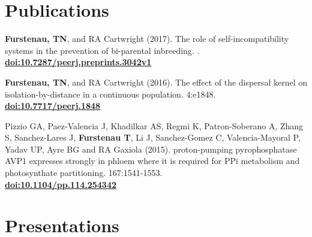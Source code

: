 \documentclass[]{cv-style}          %
\begin{document}

\section{Publications}
\textbf{Furstenau, TN}, and RA Cartwright (2017). The role of self-incompatibility systems in the prevention of bi-parental inbreeding. . \textbf{\href{| https://doi.org/10.7287/peerj.preprints.3042v1}{doi:10.7287/peerj.preprints.3042v1}}

\textbf{Furstenau, TN}, and RA Cartwright (2016). The effect of the dispersal kernel on isolation-by-distance in a continuous population.  4:e1848. \textbf{\href{https://doi.org/10.7717/peerj.1848}{doi:10.7717/peerj.1848}}

Pizzio GA, Paez-Valencia J, Khadilkar AS, Regmi K, Patron-Soberano A, Zhang S, Sanchez-Lares J, \textbf{Furstenau T}, Li J, Sanchez-Gomez C, Valencia-Mayoral P, Yadav UP, Ayre BG and RA Gaxiola (2015). proton-pumping pyrophosphatase AVP1 expresses strongly in phloem where it is required for PPi metabolism and photosynthate partitioning.  167:1541-1553.\\ \textbf{\href{http://dx.doi.org/10.1104/pp.114.254342}{doi:10.1104/pp.114.254342}}






\section{Presentations}
\end{document}
